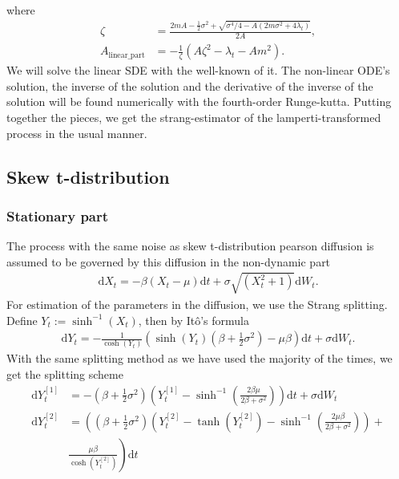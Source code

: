 where
\begin{align}
    \zeta &= \frac{2mA - \frac{1}{2}\sigma^2 + \sqrt{\sigma^4/4 - A\left(2m\sigma^2 + 4\lambda_t\right)}}{2A},\\
    A_{\mathrm{linear\_part}} &= - \frac{1}{\zeta}\left(A \zeta^2 - \lambda_t - Am^2\right).
\end{align}
We will solve the linear SDE with the well-known of it. The non-linear ODE's solution, the inverse of the solution and the derivative of the inverse of the solution will be found numerically with the fourth-order Runge-kutta. Putting together the pieces, we get the strang-estimator of the lamperti-transformed process in the usual manner.
\subsection{Skew t-distribution}
\subsubsection{Stationary part}
The process with the same noise as skew t-distribution pearson diffusion is assumed to be governed by this diffusion in the non-dynamic part
\begin{align}
    \mathrm{d}X_t = -\beta\left(X_t - \mu\right)\mathrm{d}t + \sigma \sqrt{\left(X_t^2 + 1\right)}\mathrm{d}W_t.
\end{align}
For estimation of the parameters in the diffusion, we use the Strang splitting. Define $Y_t := \sinh^{-1}(X_t)$, then by Itô's formula
\begin{align}
    \mathrm{d}Y_t = - \frac{1}{\cosh(Y_t)}\left(\sinh(Y_t)\left(\beta + \frac{1}{2}\sigma^2\right) - \mu\beta\right)\mathrm{d}t + \sigma \mathrm{d}W_t.
\end{align}
With the same splitting method as we have used the majority of the times, we get the splitting scheme
\begin{align}
    \mathrm{d}Y_t^{[1]} &= -\left(\beta + \frac{1}{2}\sigma^2\right)\left(Y_t^{[1]} - \sinh^{-1}\left(\frac{2\beta\mu}{2\beta + \sigma^2}\right)\right)\mathrm{d}t + \sigma \mathrm{d}W_t \\
    \mathrm{d}Y_t^{[2]} &= \left(\left(\beta + \frac{1}{2}\sigma^2\right) \left(Y_t^{[2]} - \tanh\left(Y_t^{[2]}\right) - \sinh^{-1}\left(\frac{2\mu\beta}{2\beta + \sigma^2}\right)\right) + \right. \nonumber \\
    &\left. \frac{\mu\beta}{\cosh\left(Y_t^{[2]}\right)}\right)\mathrm{d}t
\end{align}
